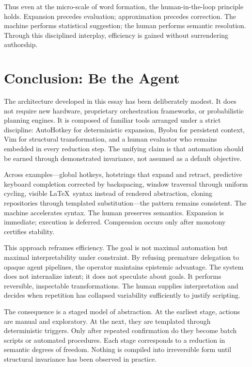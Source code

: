 \documentclass[11pt]{article}
\begin{document}
Thus even at the micro-scale of word formation, the human-in-the-loop principle holds. Expansion precedes evaluation; approximation precedes correction. The machine performs statistical suggestion; the human performs semantic resolution. Through this disciplined interplay, efficiency is gained without surrendering authorship.

\section{Conclusion: Be the Agent}

The architecture developed in this essay has been deliberately modest. It does not require new hardware, proprietary orchestration frameworks, or probabilistic planning engines. It is composed of familiar tools arranged under a strict discipline: AutoHotkey for deterministic expansion, Byobu for persistent context, Vim for structural transformation, and a human evaluator who remains embedded in every reduction step. The unifying claim is that automation should be earned through demonstrated invariance, not assumed as a default objective.

Across examples—global hotkeys, hotstrings that expand and retract, predictive keyboard completion corrected by backspacing, window traversal through uniform cycling, visible \LaTeX\ syntax instead of rendered abstraction, cloning repositories through templated substitution—the pattern remains consistent. The machine accelerates syntax. The human preserves semantics. Expansion is immediate; execution is deferred. Compression occurs only after monotony certifies stability.

This approach reframes efficiency. The goal is not maximal automation but maximal interpretability under constraint. By refusing premature delegation to opaque agent pipelines, the operator maintains epistemic advantage. The system does not internalize intent; it does not speculate about goals. It performs reversible, inspectable transformations. The human supplies interpretation and decides when repetition has collapsed variability sufficiently to justify scripting.

The consequence is a staged model of abstraction. At the earliest stage, actions are manual and exploratory. At the next, they are templated through deterministic triggers. Only after repeated confirmation do they become batch scripts or automated procedures. Each stage corresponds to a reduction in semantic degrees of freedom. Nothing is compiled into irreversible form until structural invariance has been observed in practice.
\end{document}
